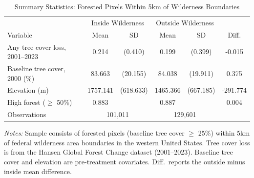 \begin{table}[t]
\centering
\caption{Summary Statistics: Forested Pixels Within 5km of Wilderness Boundaries}
\label{tab:summary}
\begin{tabular}{lccccc}
\hline\hline
 & \multicolumn{2}{c}{Inside Wilderness} & \multicolumn{2}{c}{Outside Wilderness} & \\
Variable & Mean & SD & Mean & SD & Diff. \\
\hline
Any tree cover loss, 2001--2023 & 0.214 & (0.410) & 0.199 & (0.399) & -0.015 \\
Baseline tree cover, 2000 (\%) & 83.663 & (20.155) & 84.038 & (19.911) & 0.375 \\
Elevation (m) & 1757.141 & (618.633) & 1465.366 & (667.185) & -291.774 \\
High forest ($\geq$ 50\%) & 0.883 & & 0.887 & & 0.004 \\
\hline
Observations & \multicolumn{2}{c}{101,011} & \multicolumn{2}{c}{129,601} & \\
\hline\hline
\end{tabular}
\begin{tablenotes}[flushleft]
\small
\item \textit{Notes:} Sample consists of forested pixels (baseline tree cover $\geq$ 25\%) within 5km of federal wilderness area boundaries in the western United States. Tree cover loss is from the Hansen Global Forest Change dataset (2001--2023). Baseline tree cover and elevation are pre-treatment covariates. Diff.~reports the outside minus inside mean difference.
\end{tablenotes}
\end{table}
